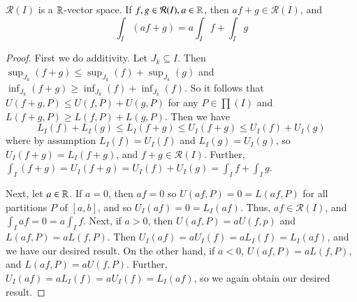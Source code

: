 \begin{proposition}\label{prop:4.2.1}
    $\mathcal{R}(I)$ is a $\mathbb R$-vector space. If $f,g \in \mathcal{R}(I), a \in \mathbb R$, then $af+g \in \mathcal{R}(I)$, and $$\int_I(af+g) = a\int_If+\int_Ig$$
\end{proposition}
\begin{proof}
    First we do additivity. Let $J_k \subseteq I$. Then $\sup_{J_k}(f+g) \leq \sup_{J_k}(f) + \sup_{J_k}(g)$ and $\inf_{J_k}(f+g) \geq \inf_{J_k}(f) + \inf_{J_k}(f)$. So it follows that $U(f+g,P) \leq U(f,P) + U(g,P)$ for any $P \in \prod(I)$ and $L(f+g,P) \geq L(f,P) + L(g,P)$. Then we have $$L_I(f) + L_I(g) \leq L_I(f+g) \leq U_I(f+g) \leq U_I(f) + U_I(g)$$ where by assumption $L_I(f) = U_I(f)$ and $L_I(g) = U_I(g)$, so $U_I(f+g) = L_I(f+g)$, and $f+g \in \mathcal{R}(I)$. Further, $\int_I(f+g) = U_I(f+g) = U_I(f) + U_I(g) = \int_If + \int_Ig$. 

    Next, let $a \in \mathbb R$. If $a = 0$, then $af = 0$ so $U(af,P) = 0 = L(af,P)$ for all partitions $P$ of $[a,b]$, and so $U_I(af) = 0 = L_I(af)$. Thus, $af \in \mathcal{R}(I)$, and $\int_Iaf = 0 =a\int_If$. Next, if $a > 0$, then $U(af,P) = aU(f,p)$ and $L(af,P) = aL(f,P)$. Then $U_I(af) = aU_I(f) = aL_I(f) = L_I(af)$, and we have our desired result. On the other hand, if $a < 0$, $U(af,P) = aL(f,P)$, and $L(af,P) = aU(f,P)$. Further, $U_I(af) = aL_I(f) = aU_I(f) = L_I(af)$, so we again obtain our desired result.
\end{proof}



